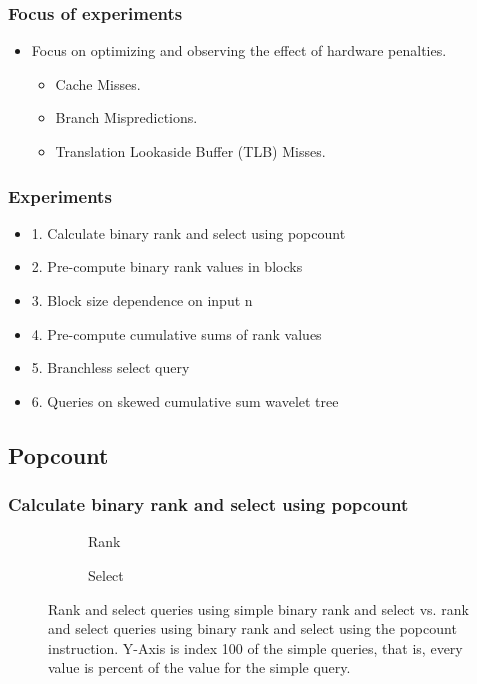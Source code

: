 \documentclass{beamer}
\begin{document}

\begin{frame}
\frametitle{Focus of experiments}
\begin{itemize}
\item Focus on optimizing and observing the effect of hardware penalties.
	\begin{itemize}
	\item Cache Misses.
	\item Branch Mispredictions.
	\item Translation Lookaside Buffer (TLB) Misses.
	\end{itemize}
\end{itemize}
\end{frame}


\begin{frame}
\frametitle{Experiments}
\begin{itemize}
\item 1. Calculate binary rank and select using popcount
\item 2. Pre-compute binary rank values in blocks
\item 3. Block size dependence on input n
\item 4. Pre-compute cumulative sums of rank values
\item 5. Branchless select query
\item 6. Queries on skewed cumulative sum wavelet tree
\end{itemize}
\end{frame}


\subsection{Popcount}
\begin{frame}
\frametitle{Calculate binary rank and select using popcount}

\begin{figure}[h!]\tiny
	\begin{subfigure}{\textwidth}
		\center \scalebox{.6}{}
		\caption{\tiny{Rank}}
	\end{subfigure}
	\begin{subfigure}{\textwidth}
		\center \scalebox{.6}{}
		\caption{\tiny{Select}}
	\end{subfigure}
	\caption{\tiny{Rank and select queries using simple binary rank and select vs. rank and select queries using binary rank and select using the popcount instruction. Y-Axis is index 100 of the simple queries, that is, every value is percent of the value for the simple query.}}
\end{figure}
\end{frame}
\end{document}
